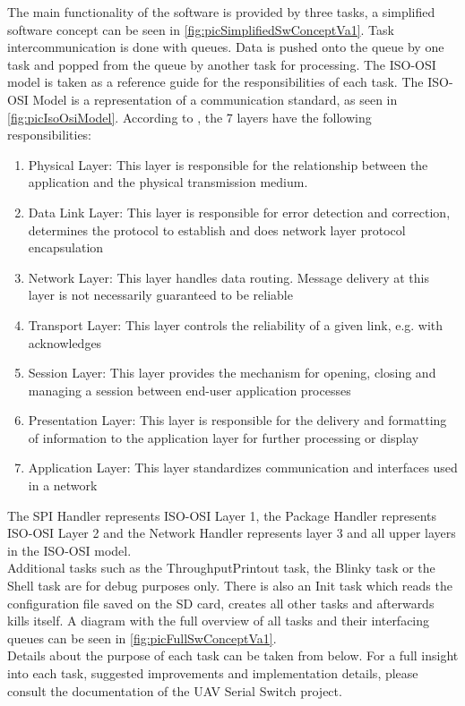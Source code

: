 The main functionality of the software is provided by three tasks, a simplified software concept can be seen in \autoref{fig:picSimplifiedSwConceptVa1}. Task intercommunication is done with queues. Data is pushed onto the queue by one task and popped from the queue by another task for processing. The ISO-OSI model is taken as a reference guide for the responsibilities of each task. The ISO-OSI Model is a representation of a communication standard, as seen in \autoref{fig:picIsoOsiModel}. According to \cite{IsoOsiModel_Wikipedia}, the 7 layers have the following responsibilities:\begin{enumerate}
    \item Physical Layer: This layer is responsible for the relationship between the application and the physical transmission medium.
    \item Data Link Layer: This layer is responsible for error detection and correction, determines the protocol to establish and does network layer protocol encapsulation
    \item Network Layer: This layer handles data routing. Message delivery at this layer is not necessarily guaranteed to be reliable
    \item Transport Layer: This layer controls the reliability of a given link, e.g. with acknowledges
    \item Session Layer: This layer provides the mechanism for opening, closing and managing a session between end-user application processes
    \item Presentation Layer: This layer is responsible for the delivery and formatting of information to the application layer for further processing or display
    \item Application Layer: This layer standardizes communication and interfaces used in a network
\end{enumerate}
The SPI Handler represents ISO-OSI Layer 1, the Package Handler represents ISO-OSI Layer 2 and the Network Handler represents layer 3 and all upper layers in the ISO-OSI model.\\
Additional tasks such as the ThroughputPrintout task, the Blinky task or the Shell task are for debug purposes only. There is also an Init task which reads the configuration file saved on the SD card, creates all other tasks and afterwards kills itself. A diagram with the full overview of all tasks and their interfacing queues can be seen in \autoref{fig:picFullSwConceptVa1}.\\
Details about the purpose of each task can be taken from below. For a full insight into each task, suggested improvements and implementation details, please consult the documentation of the UAV Serial Switch project.
%
